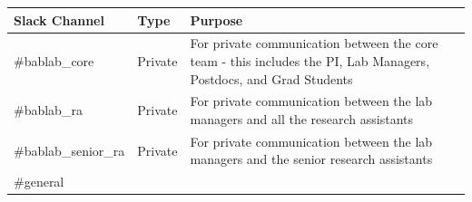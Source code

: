 \documentclass[]{book}
\begin{document}
\begin{longtable}[]{@{}lll@{}}
\toprule
\begin{minipage}[b]{0.18\columnwidth}\raggedright
Slack Channel\strut
\end{minipage} & \begin{minipage}[b]{0.04\columnwidth}\raggedright
Type\strut
\end{minipage} & \begin{minipage}[b]{0.70\columnwidth}\raggedright
Purpose\strut
\end{minipage}\tabularnewline
\midrule
\endhead
\begin{minipage}[t]{0.18\columnwidth}\raggedright
\#bablab\_core\strut
\end{minipage} & \begin{minipage}[t]{0.04\columnwidth}\raggedright
Private\strut
\end{minipage} & \begin{minipage}[t]{0.70\columnwidth}\raggedright
For private communication between the core team - this includes the PI, Lab Managers, Postdocs, and Grad Students\strut
\end{minipage}\tabularnewline
\begin{minipage}[t]{0.18\columnwidth}\raggedright
\#bablab\_ra\strut
\end{minipage} & \begin{minipage}[t]{0.04\columnwidth}\raggedright
Private\strut
\end{minipage} & \begin{minipage}[t]{0.70\columnwidth}\raggedright
For private communication between the lab managers and all the research assistants\strut
\end{minipage}\tabularnewline
\begin{minipage}[t]{0.18\columnwidth}\raggedright
\#bablab\_senior\_ra\strut
\end{minipage} & \begin{minipage}[t]{0.04\columnwidth}\raggedright
Private\strut
\end{minipage} & \begin{minipage}[t]{0.70\columnwidth}\raggedright
For private communication between the lab managers and the senior research assistants\strut
\end{minipage}\tabularnewline
\begin{minipage}[t]{0.18\columnwidth}\raggedright
\#general\strut
\end{minipage} & \begin{minipage}[t]{0.04\columnwidth}\raggedright

\end{minipage}
\end{longtable}
\end{document}
